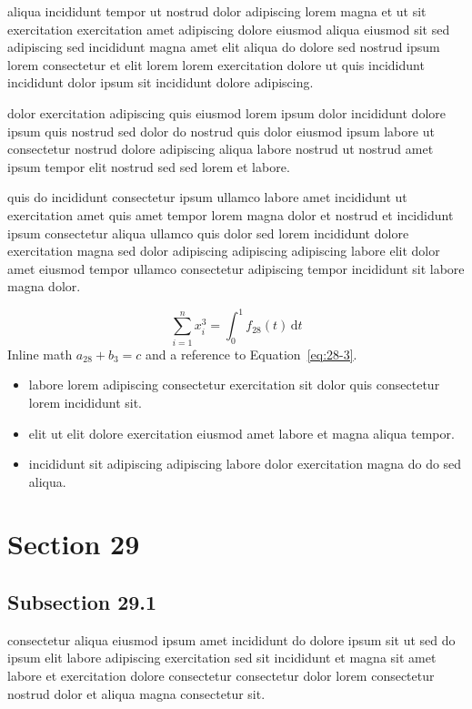 \documentclass{article}
\begin{document}
aliqua incididunt tempor ut nostrud dolor adipiscing lorem magna et ut sit exercitation exercitation amet adipiscing dolore eiusmod aliqua eiusmod sit sed adipiscing sed incididunt magna amet elit aliqua do dolore sed nostrud ipsum lorem consectetur et elit lorem lorem exercitation dolore ut quis incididunt incididunt dolor ipsum sit incididunt dolore adipiscing.

dolor exercitation adipiscing quis eiusmod lorem ipsum dolor incididunt dolore ipsum quis nostrud sed dolor do nostrud quis dolor eiusmod ipsum labore ut consectetur nostrud dolore adipiscing aliqua labore nostrud ut nostrud amet ipsum tempor elit nostrud sed sed lorem et labore.

quis do incididunt consectetur ipsum ullamco labore amet incididunt ut exercitation amet quis amet tempor lorem magna dolor et nostrud et incididunt ipsum consectetur aliqua ullamco quis dolor sed lorem incididunt dolore exercitation magna sed dolor adipiscing adipiscing adipiscing labore elit dolor amet eiusmod tempor ullamco consectetur adipiscing tempor incididunt sit labore magna dolor.

\begin{equation}\label{eq:28-3}
  \sum_{i=1}^{n} x_i^{3} = \int_0^1 f_{28}(t)\,\mathrm{d}t
\end{equation}
Inline math $a_{28} + b_{3} = c$ and a reference to Equation~\eqref{eq:28-3}.

\begin{itemize}
  \item labore lorem adipiscing consectetur exercitation sit dolor quis consectetur lorem incididunt sit.
  \item elit ut elit dolore exercitation eiusmod amet labore et magna aliqua tempor.
  \item incididunt sit adipiscing adipiscing labore dolor exercitation magna do do sed aliqua.
\end{itemize}

\section{Section 29}\label{sec:29}
\subsection{Subsection 29.1}\label{sec:29-1}
consectetur aliqua eiusmod ipsum amet incididunt do dolore ipsum sit ut sed do ipsum elit labore adipiscing exercitation sed sit incididunt et magna sit amet labore et exercitation dolore consectetur consectetur dolor lorem consectetur nostrud dolor et aliqua magna consectetur sit.
\end{document}
